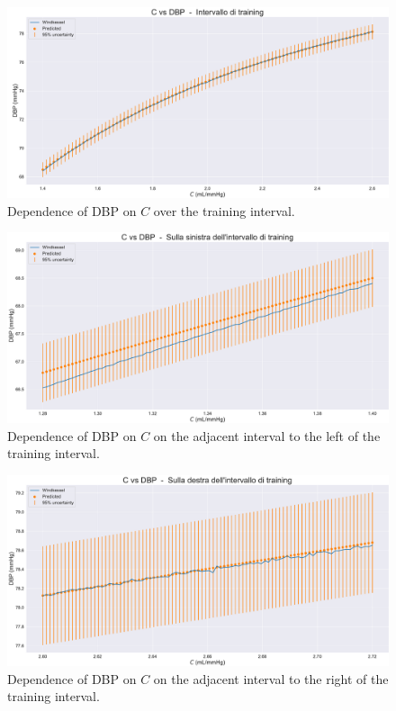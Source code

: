 \vspace{0.32cm}

\begin{figure}[!htb]
    \centering
    \includegraphics[width=1\textwidth]{images/Training (risultati)/DBP/DBP - C - training.pdf}
    \caption{Dependence of DBP on $C$ over the training interval.}
    \label{DBP - C - training}
\end{figure}



\begin{figure}
    \centering
    \includegraphics[width=1\textwidth]{images/Training (risultati)/DBP/DBP - C - sx.pdf}
    \caption{Dependence of DBP on $C$ on the adjacent interval to the left of the training interval.}
    \label{DBP - C - sx}
\end{figure}


\begin{figure}
    \centering
    \includegraphics[width=1\textwidth]{images/Training (risultati)/DBP/DBP - C - dx.pdf}
    \caption{Dependence of DBP on $C$ on the adjacent interval to the right of the training interval.}
    \label{DBP - C - dx}
\end{figure}


